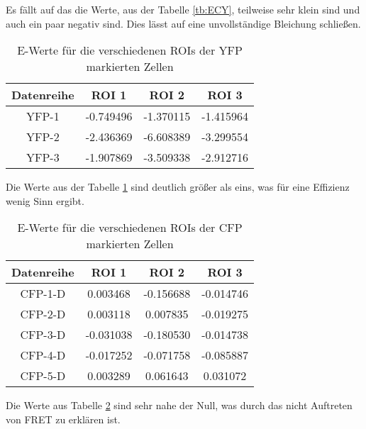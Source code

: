 Es fällt auf das die Werte, aus der Tabelle \ref{tb:ECY}, teilweise sehr klein sind und auch ein paar negativ sind. Dies lässt auf eine unvollständige Bleichung schließen.

\begin{table}[h]
    \centering
    \begin{tabular}{c|c|c|c}
        Datenreihe &     ROI 1 &     ROI 2 &     ROI 3 \\\hline\hline
         YFP-1 & -0.749496 & -1.370115 & -1.415964 \\\hline
         YFP-2 & -2.436369 & -6.608389 & -3.299554 \\\hline
         YFP-3 & -1.907869 & -3.509338 & -2.912716 \\\hline
        \end{tabular}
        \caption{E-Werte für die verschiedenen ROIs der YFP markierten Zellen}
        \label{tb:EYFP}
\end{table}

Die Werte aus der Tabelle \ref{tb:EYFP} sind deutlich größer als eins, was für eine Effizienz wenig Sinn ergibt.

\begin{table}[h]
    \centering
    \begin{tabular}{c|c|c|c}
        Datenreihe &     ROI 1 &     ROI 2 &     ROI 3 \\\hline\hline
        CFP-1-D &  0.003468 & -0.156688 & -0.014746 \\\hline
        CFP-2-D &  0.003118 &  0.007835 & -0.019275 \\\hline
        CFP-3-D & -0.031038 & -0.180530 & -0.014738 \\\hline
        CFP-4-D & -0.017252 & -0.071758 & -0.085887 \\\hline
        CFP-5-D &  0.003289 &  0.061643 &  0.031072 \\\hline
        \end{tabular}
        \caption{E-Werte für die verschiedenen ROIs der CFP markierten Zellen}
        \label{tb:ECFP}
\end{table}

Die Werte aus Tabelle \ref{tb:ECFP} sind sehr nahe der Null, was durch das nicht Auftreten von FRET zu erklären ist.